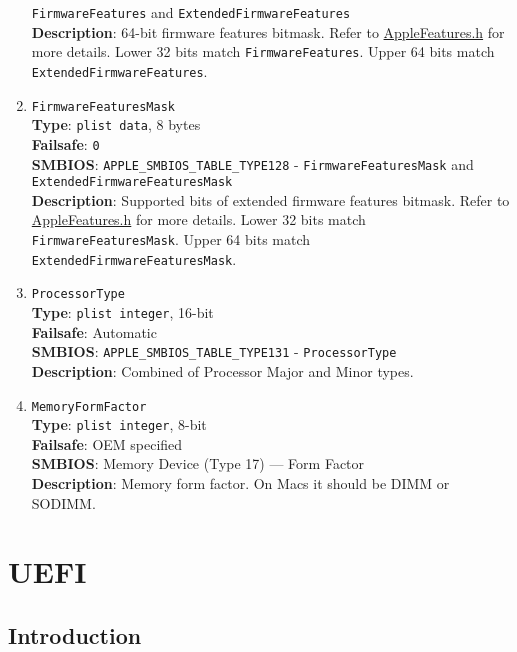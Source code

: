 \documentclass[]{article}
\makeatletter
\renewcommand{\label}[1]{%
\zref@wrapper@immediate{\oldlabel{#1}}}  %
\makeatother
\begin{document}
\begin{enumerate}
  \texttt{FirmwareFeatures} and \texttt{ExtendedFirmwareFeatures}\\
  \textbf{Description}: 64-bit firmware features bitmask. Refer to
  \href{https://github.com/acidanthera/EfiPkg/blob/master/Include/IndustryStandard/AppleFeatures.h}{AppleFeatures.h}
  for more details. Lower 32 bits match \texttt{FirmwareFeatures}. Upper
  64 bits match \texttt{ExtendedFirmwareFeatures}.
\item
  \texttt{FirmwareFeaturesMask}\\
  \textbf{Type}: \texttt{plist\ data}, 8 bytes\\
  \textbf{Failsafe}: \texttt{0}\\
  \textbf{SMBIOS}: \texttt{APPLE\_SMBIOS\_TABLE\_TYPE128} -
  \texttt{FirmwareFeaturesMask} and
  \texttt{ExtendedFirmwareFeaturesMask}\\
  \textbf{Description}: Supported bits of extended firmware features
  bitmask. Refer to
  \href{https://github.com/acidanthera/EfiPkg/blob/master/Include/IndustryStandard/AppleFeatures.h}{AppleFeatures.h}
  for more details. Lower 32 bits match \texttt{FirmwareFeaturesMask}.
  Upper 64 bits match \texttt{ExtendedFirmwareFeaturesMask}.
\item
  \texttt{ProcessorType}\\
  \textbf{Type}: \texttt{plist\ integer}, 16-bit\\
  \textbf{Failsafe}: Automatic\\
  \textbf{SMBIOS}: \texttt{APPLE\_SMBIOS\_TABLE\_TYPE131} -
  \texttt{ProcessorType}\\
  \textbf{Description}: Combined of Processor Major and Minor types.
\item
  \texttt{MemoryFormFactor}\\
  \textbf{Type}: \texttt{plist\ integer}, 8-bit\\
  \textbf{Failsafe}: OEM specified\\
  \textbf{SMBIOS}: Memory Device (Type 17) --- Form Factor\\
  \textbf{Description}: Memory form factor. On Macs it should be DIMM or
  SODIMM.
\end{enumerate}

\section{UEFI}\label{uefi}

\subsection{Introduction}\label{uefiintro}
\end{document}
